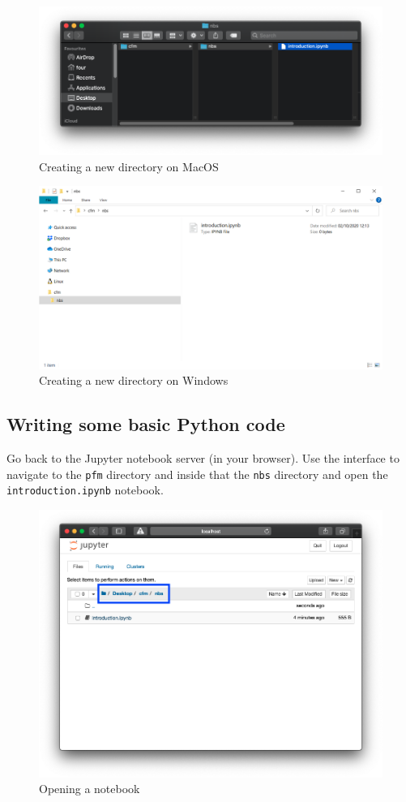 \begin{figure}[htbp]
\centering
    \includegraphics[width=0.750\linewidth]{assets/new_directory_structure/main.png}
    \caption{Creating a new directory on MacOS}\label{fig:new_directory_structure}
\end{figure}


\begin{figure}[htbp]
\centering
    \includegraphics[width=0.750\linewidth]{assets/new_directory_structure_windows/main.png}
    \caption{Creating a new directory on
    Windows}\label{fig:new_directory_structure_windows}
\end{figure}


\subsection{Writing some basic Python code}
Go back to the Jupyter notebook server (in your browser).
Use the interface to navigate to the \texttt{pfm} directory and inside that the \texttt{nbs}
directory and open the \texttt{introduction.ipynb} notebook.

\begin{figure}[htbp]
\centering
    \includegraphics[width=0.750\linewidth]{assets/opening_notebook/main.png}
    \caption{Opening a notebook}
\end{figure}


